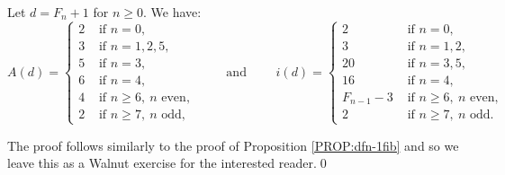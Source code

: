 \documentclass[10pt,a4paper,reqno]{amsart}
\newcommand{\walnut}{{\ttfamily Walnut}}
\begin{document}
\begin{prop}\label{PROP:dfn+1fib}
Let $d=F_n+1$ for $n\geq 0$. We have:
\[
A(d) =
\begin{cases}
2 &\text{ if } n=0,\\
3 &\text{ if } n=1,2,5,\\
5 &\text{ if } n=3,\\
6 &\text{ if } n=4,\\
4 &\text{ if } n \geq 6, \ n\text{ even}, \\
2 &\text{ if } n \geq 7, \ n\text{ odd}, 
\end{cases}
\qquad \text{ and } \qquad
i(d) =
\begin{cases}
2 &\text{ if } n=0,\\
3 &\text{ if } n=1,2,\\
20 &\text{ if } n=3,5,\\
16 &\text{ if } n=4,\\
F_{n-1}-3 &\text{ if } n \geq 6, \ n\text{ even}, \\
2 &\text{ if } n \geq 7, \ n\text{ odd}.
\end{cases}
\]
\end{prop}
The proof follows similarly to the proof of Proposition \ref{PROP:dfn-1fib} and so we leave this as a \walnut{} exercise for the interested reader.\hfill\qed
\end{document}

